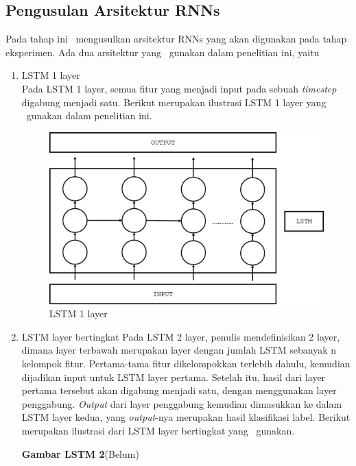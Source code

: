 \subsection{Pengusulan Arsitektur RNNs}
Pada tahap ini \saya~mengusulkan arsitektur RNNs yang akan digunakan pada tahap eksperimen. Ada dua arsitektur yang \saya~gunakan dalam penelitian ini, yaitu
\begin{enumerate}
	\item LSTM 1 layer\\
	Pada LSTM 1 layer, semua fitur yang menjadi input pada sebuah \textit{timestep} digabung menjadi satu. Berikut merupakan ilustrasi LSTM 1 layer yang \saya~gunakan dalam penelitian ini.
	
	\begin{figure}
		\centering
		\includegraphics[width=0.8\linewidth]{images/single_layer_rnn}
		\caption{LSTM 1 layer}
		\label{fig:single_layer_rnn}
	\end{figure}

	\item LSTM layer bertingkat
	Pada LSTM 2 layer, penulis mendefinisikan 2 layer, dimana layer terbawah merupakan layer dengan jumlah LSTM sebanyak n kelompok fitur. Pertama-tama fitur dikelompokkan terlebih dahulu, kemudian dijadikan input untuk LSTM layer pertama. Setelah itu, hasil dari layer pertama tersebut akan digabung menjadi satu, dengan menggunakan layer penggabung. \textit{Output} dari layer penggabung kemudian dimasukkan ke dalam LSTM layer kedua, yang \textit{output}-nya merupakan hasil klasifikasi label. Berikut merupakan ilustrasi dari LSTM layer bertingkat yang \saya~gunakan.
	
	\textbf{Gambar LSTM 2}(Belum)
	
\end{enumerate}
	
